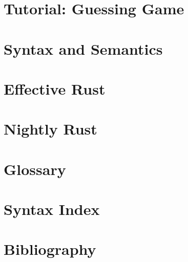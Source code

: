 \documentclass[fontsize=12pt]{scrartcl}
\begin{document}
    \pagebreak
    \section{Tutorial: Guessing Game}
    \label{sec:tutorial}
    
    
    \pagebreak
    \section{Syntax and Semantics}
    \label{sec:syntax}
    
    
    \pagebreak
    \section{Effective Rust}
    \label{sec:effective_rust}
    
    \pagebreak
    \section{Nightly Rust}
    \label{sec:nightly_rust}
    
    \pagebreak
    \section{Glossary}
    \label{sec:glossary}
    
    
    \pagebreak
    \section{Syntax Index}
    \label{sec:syntax_index}
    
    \pagebreak
    \section{Bibliography}
    \label{sec:bib}
    
    
\end{document}

